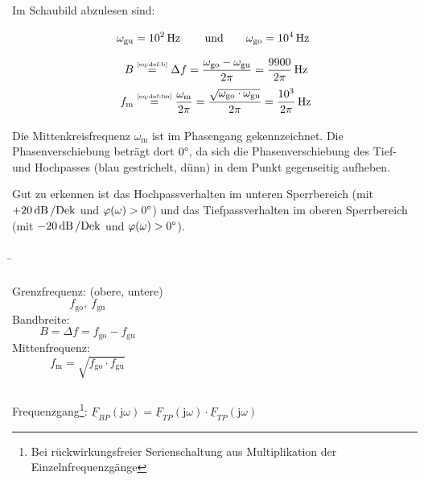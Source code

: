 \begin{frame}
{    Im Schaubild abzulesen sind:
    \begin{align}
        \omega_{\mathrm{gu}} &= 10^2\operatorname{Hz} \qquad \text{und} \qquad
            \omega_{\mathrm{go}} = 10^4\operatorname{Hz}\vphantom{\bigg|}\\
        B &\overset{\tiny\ref{eq:def:b}}{=} \Delta f = \frac{\omega_{\mathrm{go}} - \omega_{\mathrm{gu}}}{2\pi}
            = \frac{9900}{2\pi}\operatorname{Hz}\vphantom{\bigg|}\\
        f_{\mathrm{m}} &\overset{\tiny\ref{eq:def:fm}}{=} \frac{\omega_{\mathrm{m}}}{2\pi} 
            = \frac{\sqrt{\omega_{\mathrm{go}} \cdot \omega_{\mathrm{gu}}}}{2\pi} = \frac{10^3}{2\pi}\operatorname{Hz}\vphantom{\bigg|}
    \end{align}
    
    Die Mittenkreisfrequenz $\omega_{\mathrm{m}}$ ist im Phasengang gekennzeichnet.
    Die Phasenverschiebung beträgt dort $0\degree$, da sich die Phasenverschiebung des Tief- und Hochpasses
    (blau gestrichelt, dünn) in dem Punkt gegenseitig aufheben.

    Gut zu erkennen ist das Hochpassverhalten im unteren Sperrbereich (mit $+20\operatorname{dB}/\mathrm{Dek}$ und $\varphi(\omega) > 0\degree$)
    und das Tiefpassverhalten im oberen Sperrbereich (mit $-20\operatorname{dB}/\mathrm{Dek}$ und $\varphi(\omega) > 0\degree$).

}
\b{
    \begin{columns}[c]
        \centering%
            \hfill%

        \centering%
            \flushleft
            Grenzfrequenz: (obere, untere)
                \begin{equation*}f_{\mathrm{go}},\ f_{\mathrm{gu}} \end{equation*}
            Bandbreite:
                \begin{equation*}B = \Delta f = f_{\mathrm{go}} - f_{\mathrm{gu}}\end{equation*}
            Mittenfrequenz:
                \begin{equation*}f_{\mathrm{m}} = \sqrt{f_{\mathrm{go}} \cdot f_{\mathrm{gu}}}\end{equation*}
    \end{columns}
    Frequenzgang\footnote{Bei rückwirkungsfreier Serienschaltung aus Multiplikation der Einzelnfrequenzgänge}:%
    $\underline{F}_{BP}(\mathrm{j}\omega)=\underline{F}_{TP}(\mathrm{j}\omega)\cdot\underline{F}_{TP}(\mathrm{j}\omega)$%
}
\end{frame}

